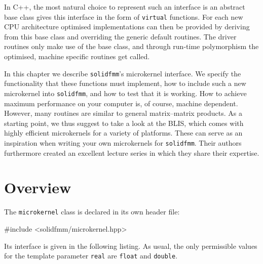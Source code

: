 \documentclass{scrbook}
\newcommand{\solidfmm}{\texttt{solidfmm}}
\begin{document}
In C++, the most natural choice to represent such an interface is an abstract
base class gives this interface in the form of \lstinline[style=cpp]|virtual|
functions. For each new CPU architecture optimised implementations can then be
provided by deriving from this base class and overriding the generic default
routines. The driver routines only make use of the base class, and through
run-time polymorphism the optimised, machine specific routines get called.

In this chapter we describe \solidfmm's microkernel interface. We specify the
functionality that these functions must implement, how to include such
a new microkernel into \solidfmm, and how to test that it is working. How to
achieve maximum performance on your computer is, of course, machine dependent.
However, many routines are similar to general matrix--matrix products. As a
starting point, we thus suggest to take a look at the
BLIS,\autocite{blisproject} which comes with highly efficient microkernels for
a variety of platforms. These can serve as an inspiration when writing your own
microkernels for \solidfmm. Their authors furthermore created an excellent
lecture series in which they share their expertise.\autocite{laffproject}

\section{Overview}
The \lstinline|microkernel| class is declared in its own header file:
\begin{cppcode*}
#include <solidfmm/microkernel.hpp>
\end{cppcode*}

Its interface is given in the following listing. As usual, the only permissible
values for the template parameter \lstinline|real| are
\lstinline[style=cpp]|float| and \lstinline[style=cpp]|double|.
\end{document}
